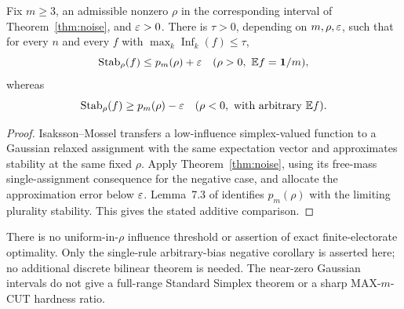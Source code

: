 \begin{corollary}\label{cor:discrete}
Fix $m\geq3$, an admissible nonzero $\rho$ in the corresponding interval of
Theorem~\ref{thm:noise}, and $\varepsilon>0$. There is $\tau>0$, depending on
$m,\rho,\varepsilon$, such that for every $n$ and every $f$ with
$\max_k\operatorname{Inf}_k(f)\leq\tau$,
\[
 \operatorname{Stab}_\rho(f)\leq p_m(\rho)+\varepsilon
 \quad(\rho>0,\ \mathbb E f=\mathbf 1/m),
\]
whereas
\[
 \operatorname{Stab}_\rho(f)\geq p_m(\rho)-\varepsilon
 \quad(\rho<0,\ \text{with arbitrary }\mathbb E f).
\]
\end{corollary}
\begin{proof}
Isaksson--Mossel \cite[Theorem 7.1]{IM2009} transfers a low-influence
simplex-valued function to a Gaussian relaxed assignment with the same
expectation vector and approximates stability at the same fixed $\rho$.
Apply Theorem~\ref{thm:noise}, using its free-mass single-assignment consequence
for the negative case, and allocate the approximation error below $\varepsilon$.
Lemma~7.3 of \cite{IM2009} identifies $p_m(\rho)$ with the limiting plurality
stability. This gives the stated additive comparison.
\end{proof}
There is no uniform-in-$\rho$ influence threshold or assertion of exact
finite-electorate optimality. Only the single-rule arbitrary-bias negative
corollary is asserted here; no additional discrete bilinear theorem is needed.
The near-zero Gaussian intervals do not give a full-range Standard Simplex
theorem or a sharp MAX-$m$-CUT hardness ratio.

